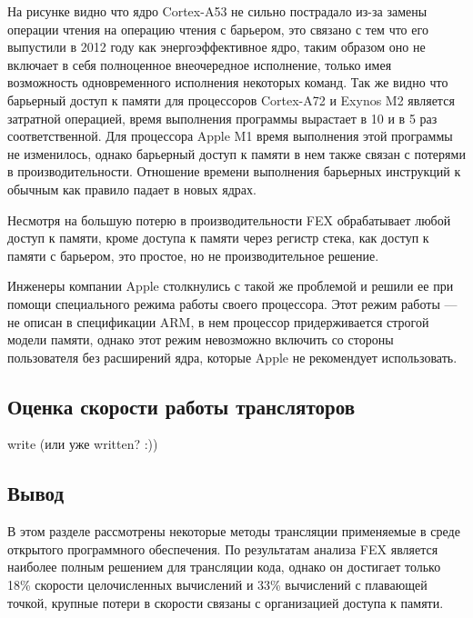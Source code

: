 На рисунке видно что ядро Cortex-A53 не сильно пострадало из-за замены операции чтения на операцию чтения с барьером, это связано с тем что его выпустили в 2012 году как энергоэффективное ядро, таким образом оно не включает в себя полноценное внеочередное исполнение, только имея возможность одновременного исполнения некоторых команд. Так же видно что барьерный доступ к памяти для процессоров Cortex-A72 и Exynos M2 является затратной операцией, время выполнения программы вырастает в 10 и в 5 раз соответственной. Для процессора Apple M1 время выполнения этой программы не изменилось, однако барьерный доступ к памяти в нем также связан с потерями в производительности. Отношение времени выполнения барьерных инструкций к обычным как правило падает в новых ядрах.

Несмотря на большую потерю в производительности FEX обрабатывает любой доступ к памяти, кроме доступа к памяти через регистр стека, как доступ к памяти с барьером, это простое, но не производительное решение.

Инженеры компании Apple столкнулись с такой же проблемой и решили ее при помощи специального режима работы своего процессора. Этот режим работы --- не описан в спецификации ARM, в нем процессор придерживается строгой модели памяти, однако этот режим невозможно включить со стороны пользователя без расширений ядра, которые Apple не рекомендует использовать.

\subsection{Оценка скорости работы трансляторов}

write (или уже written? :))

\subsection{Вывод}

В этом разделе рассмотрены некоторые методы трансляции применяемые в среде открытого программного обеспечения. По результатам анализа FEX является наиболее полным решением для трансляции кода, однако он достигает только 18\% скорости целочисленных вычислений и 33\% вычислений с плавающей точкой, крупные потери в скорости связаны с организацией доступа к памяти.

